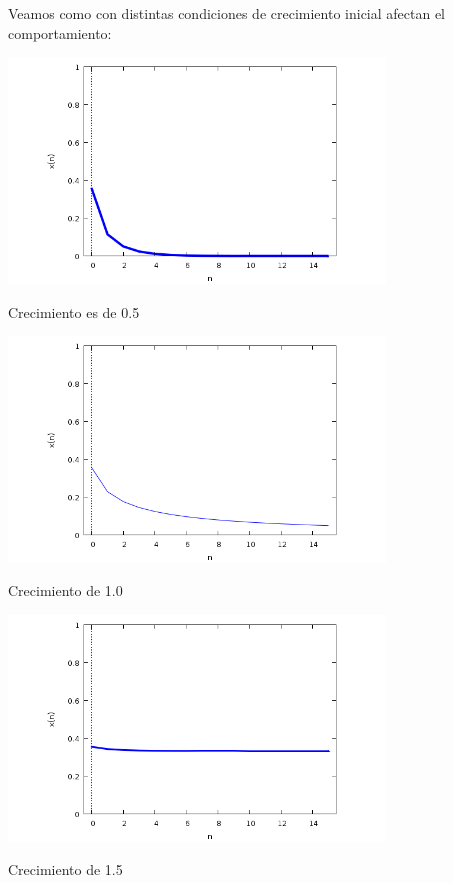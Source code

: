 \documentclass{article} %
\begin{document}
Veamos como con distintas condiciones de crecimiento inicial afectan el comportamiento:

\begin{center}

	\includegraphics[width=10cm]{1.png}
    
Crecimiento es de 0.5    

\end{center}

\begin{center}

	\includegraphics[width=10cm]{2.png}
    
Crecimiento de 1.0

\end{center}

\begin{center}

	\includegraphics[width=10cm]{3.png}

Crecimiento de 1.5

\end{center}
\end{document}
